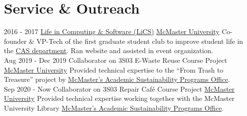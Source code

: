\documentclass[letterpaper]{twentysecondcv} %
\begin{document}
\vspace{-.5em}
\section{Service \& Outreach}
\vspace{-.5em}
\begin{twenty}
	\twentyitem
	{2016 - 2017}
	{}
	{\href{https://lics.cas.mcmaster.ca/node/17}{Life in Computing \& Software (LiCS)}}
	{\href{https://www.mcmaster.ca/}{McMaster University}}
	{}
	{Co-founder \& VP-Tech of the first graduate student club to improve student life in the \href{https://www.eng.mcmaster.ca/cas}{CAS department}. Ran website and assisted in event organization.}
\\
\twentyitem
{Aug 2019 -}
{Dec 2019}
{Collaborator on 3S03 E-Waste Reuse Course Project}
{\href{https://www.mcmaster.ca/}{McMaster University}}
{}
{Provided technical expertise to the ``From Trash to Treasure'' project by \href{https://asp.mcmaster.ca/}{McMaster's Academic Sustainability Programs Office}.}
\\
\twentyitem
{Sep 2020 -}
{Now}
{Collaborator on 3S03 Repair Caf\'{e} Course Project}
{\href{https://www.mcmaster.ca/}{McMaster University}}
{}
{Provided technical expertise working together with the McMaster University Library \href{https://asp.mcmaster.ca/}{McMaster's Academic Sustainability Programs Office}.}
\end{twenty}
\end{document}
